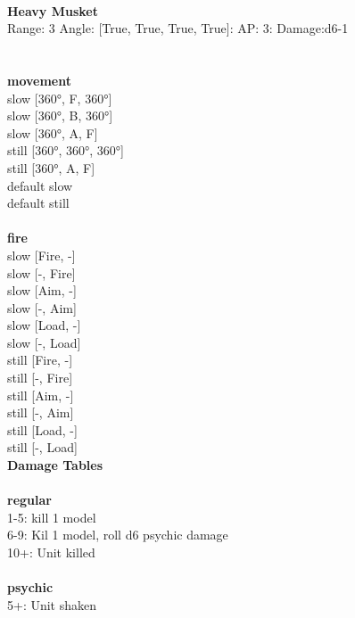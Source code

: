 \ \\
{\bf Heavy Musket } \\



Range: 3  Angle: [True, True, True, True]: AP: 3: Damage:d6-1 \\




 
\ \\



\ \\ {\bf movement } \\
slow [360°, F, 360°] \\
slow [360°, B, 360°] \\
slow [360°, A, F] \\
still [360°, 360°, 360°] \\
still [360°, A, F] \\
default slow \\
default still \\
\ \\ {\bf fire } \\
slow [Fire, -] \\
slow [-, Fire] \\
slow [Aim, -] \\
slow [-, Aim] \\
slow [Load, -] \\
slow [-, Load] \\
still [Fire, -] \\
still [-, Fire] \\
still [Aim, -] \\
still [-, Aim] \\
still [Load, -] \\
still [-, Load] \\


{\bf Damage Tables} \\
\ \\ {\bf regular } \\
1-5: kill 1 model \\
6-9: Kil 1 model, roll d6 psychic damage \\
10+: Unit killed \\
\ \\ {\bf psychic } \\
5+: Unit shaken \\










